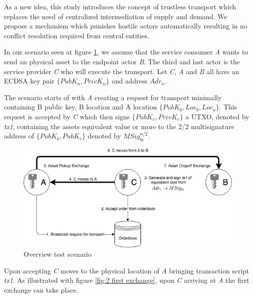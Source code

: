 As a new idea, this study introduces the concept of trustless transport which replaces the need of centralized intermediation of supply and demand. We propose a mechanism which punishes hostile actors automatically resulting in no conflict resolution required from central entities. \par
In our scenario seen at figure \ref{fig:1 main overview}, we assume that the service consumer \textit{A} wants to send an physical asset to the endpoint actor \textit{B}. The third and last actor is the service provider \textit{C} who will execute the transport. Let \textit{C}, \textit{A} and \textit{B} all have an ECDSA key pair \(\{PubK_n, PrivK_n\}\) and address \(Adr_n\). \par
The scenario starts of with \textit{A} creating a request for transport minimally containing B public key, B location and A location \(\{PubK_b, Loc_b, Loc_a\}\). This request is accepted by \textit{C} which then signs \(\{PubK_c, PrivK_c\}\) a UTXO, denoted by \textit{tx1}, containing the assets equivalent value or more to the 2/2 multisignature address of \(\{PubK_b, PubK_c\}\) denoted by \(MSig_{bc}^{n/2}\). \par

\begin{figure}[h]
\centering
\includegraphics[width=1\textwidth]{images/main.png}
\caption{Overview test scenario}
\label{fig:1 main overview}
\end{figure}

Upon accepting \textit{C} moves to the physical location of \textit{A} bringing transaction script \textit{tx1}. As illustrated with figure \ref{fig:2 first exchange}, upon \textit{C} arriving at \textit{A} the first exchange can take place. \par

